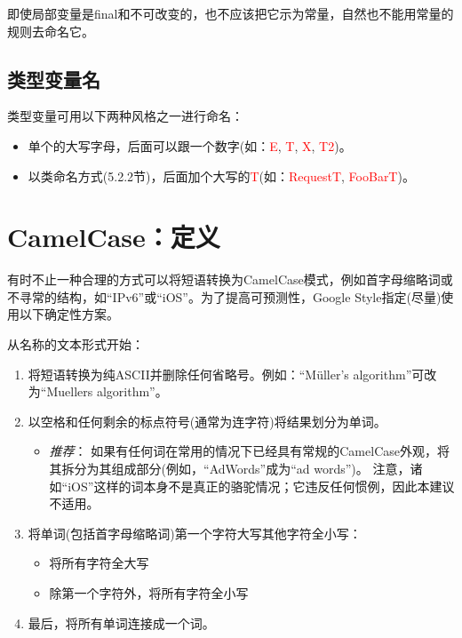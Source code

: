\documentclass[cn,11pt,chinese]{elegantbook}
\begin{document}
即使局部变量是final和不可改变的，也不应该把它示为常量，自然也不能用常量的规则去命名它。

\subsection{类型变量名}
类型变量可用以下两种风格之一进行命名：
\begin{itemize}
	\item 单个的大写字母，后面可以跟一个数字(如：\textcolor{red}{E}, \textcolor{red}{T}, \textcolor{red}{X}, \textcolor{red}{T2})。
	\item 以类命名方式(5.2.2节)，后面加个大写的\textcolor{red}{T}(如：\textcolor{red}{RequestT}, \textcolor{red}{FooBarT})。
\end{itemize}

\section{CamelCase：定义}
有时不止一种合理的方式可以将短语转换为CamelCase模式，例如首字母缩略词或不寻常的结构，如``IPv6''或``iOS''。为了提高可预测性，Google Style指定(尽量)使用以下确定性方案。

从名称的文本形式开始：
\begin{enumerate}
	\item 将短语转换为纯ASCII并删除任何省略号。例如：``Müller's algorithm''可改为``Muellers algorithm''。
	\item 以空格和任何剩余的标点符号(通常为连字符)将结果划分为单词。
	\begin{itemize}
		\item \emph{推荐}： 如果有任何词在常用的情况下已经具有常规的CamelCase外观，将其拆分为其组成部分(例如，``AdWords''成为``ad words'')。 注意，诸如``iOS''这样的词本身不是真正的骆驼情况；它违反任何惯例，因此本建议不适用。
	\end{itemize}
	\item 将单词(包括首字母缩略词)第一个字符大写其他字符全小写：
	\begin{itemize}
		\item 将所有字符全大写
		\item 除第一个字符外，将所有字符全小写
	\end{itemize}
	\item 最后，将所有单词连接成一个词。
\end{enumerate}
\end{document}
